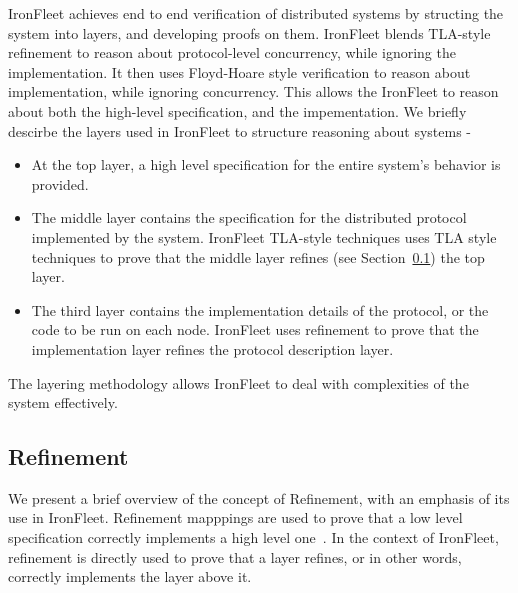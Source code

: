 \documentclass{llncs}
\begin{document}
IronFleet achieves end to end verification of distributed systems by structing the system into layers, and 
developing proofs on them. IronFleet blends TLA-style refinement to reason about protocol-level concurrency, 
while ignoring the implementation. It then uses Floyd-Hoare style verification to reason about implementation,
while ignoring concurrency. This allows the IronFleet to reason about both the high-level specification, and
the impementation. We briefly descirbe the layers used in IronFleet to structure reasoning about systems - 

\begin{itemize}
\item At the top layer, a high level specification for the entire system's behavior is provided. 
\item The middle layer contains the specification for the distributed protocol implemented by the
    system. IronFleet TLA-style techniques uses TLA style techniques to prove that the middle layer 
    refines (see Section~\ref{sec:refinement}) the top layer.
\item The third layer contains the implementation details of the protocol, or the code to be run on each node.
    IronFleet uses refinement to prove that the implementation layer refines the protocol description layer. 
\end{itemize}

The layering methodology allows IronFleet to deal with complexities of the system effectively. 

\subsection{Refinement}\label{sec:refinement}
We present a brief overview of the concept of Refinement, with an emphasis of its use in
IronFleet. Refinement mapppings are used to prove that a low level specification correctly
implements a high level one~\cite{Abadi}. In the context of IronFleet, refinement is directly 
used to prove that a layer refines, or in other words, correctly implements the layer above it.
\end{document}
